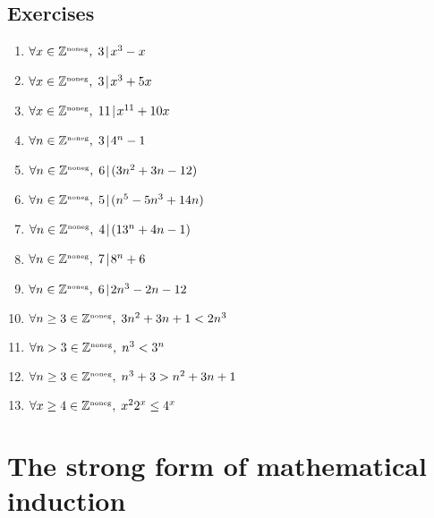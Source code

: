 \documentclass[10pt,]{book}
\theoremstyle{plain}
\theoremstyle{definition}
\theoremstyle{definition}
\numberwithin{equation}{section}
\renewcommand{\Naturals}{{\mathbb Z}^{\mbox{\tiny noneg}} }
\newcommand{\divides}{\!\mid\!}
\newcommand{\Naturals}{{\mathbb N}}
\newcommand{\lt}{ < }
\begin{document}
\subsection[{Exercises}]{Exercises}\label{exercises-28}
\leavevmode%
\begin{enumerate}[label=(\alph*)]
\item\hypertarget{li-378}{}
          \(\forall x \in \Naturals, \; 3 \divides x^3-x\)
\item\hypertarget{li-379}{}
          \(\forall x \in \Naturals, \; 3 \divides x^3+5x\)
\item\hypertarget{li-380}{}
          \(\forall x \in \Naturals, \; 11 \divides x^{11}+10x\)
\item\hypertarget{li-381}{}
          \(\forall n \in \Naturals, \; 3 \divides 4^n-1\)
\item\hypertarget{li-382}{}
          \(\forall n \in \Naturals, \; 6 \divides (3n^{2}+3n-12)\)
\item\hypertarget{li-383}{}
          \(\forall n \in \Naturals, \; 5 \divides (n^{5}-5n^{3}+14n)\)
\item\hypertarget{li-384}{}
          \(\forall n \in \Naturals, \; 4 \divides (13^{n}+4n-1)\)
\item\hypertarget{li-385}{}
          \(\forall n \in \Naturals, \; 7 \divides 8^n+6\)
\item\hypertarget{li-386}{}
          \(\forall n \in \Naturals, \; 6 \divides 2n^3 - 2n - 12\)
\item\hypertarget{li-387}{}
          \(\forall n \geq 3 \in \Naturals, \; 3n^2+3n+1 \lt  2n^3\)
\item\hypertarget{li-388}{}
          \(\forall n > 3 \in \Naturals, \; n^3 \lt  3^n\)
\item\hypertarget{li-389}{}
          \(\forall n \geq 3 \in \Naturals, \; n^{3}+3>n^{2}+3n+1\)
\item\hypertarget{li-390}{}
          \(\forall x \geq 4 \in \Naturals, \; x^22^x \leq 4^x\)
\end{enumerate}
\typeout{************************************************}
\typeout{************************************************}
\section[{The strong form of mathematical induction}]{The strong form of mathematical induction}\label{section-29}
\end{document}
